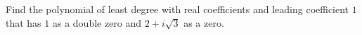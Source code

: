 Find the polynomial of least degree with real coefficients and leading coefficient $1$ that has $1$ as a double zero and $2+i\sqrt3$ as a zero.
